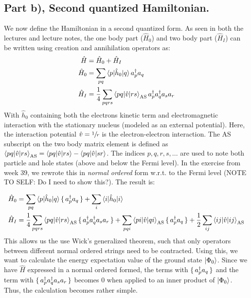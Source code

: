 \documentclass{article}
\newcommand{\gs}{\ket{\Phi_0}}
\newcommand{\inner}[3]{\braket{#1|#2|#3}}
\newcommand{\innerAS}[3]{\inner{#1}{#2}{#3}_{\text{AS}}}
\newcommand{\hnull}{\hat{h}_0}
\newcommand{\crt}[1]{a_{#1}^{\dagger}}
\newcommand{\ani}[1]{a_{#1}}
\begin{document}
\subsection*{Part b), Second quantized Hamiltonian.}
    We now define the Hamiltonian in a second quantized form. As seen in both the lectures and lecture notes, the one body part ($\hat{H}_0$) and two body part ($\hat{H}_I$) can be written using creation and annihilation operators as: 
    \begin{align*}
        \hat{H} &= \hat{H}_0 + \hat{H}_I \\
        \hat{H}_0 &= \sum_{pq} \inner{p}{\hnull}{q}\crt{p}\ani{q} \\
        \hat{H}_I &= \frac{1}{4} \sum_{pqrs} \innerAS{pq}{\hat{v}}{rs} \crt{p}\crt{q}\ani{s}\ani{r}
    \end{align*}
    With $\hnull$ containing both the electrons kinetic term and electromagnetic interaction with the stationary nucleus (modeled as an external potential). Here, the interaction potential $\hat{v} = \sfrac{1}{r}$ is the electron-electron interaction. The AS subscript on the two body matrix element is defined as $\innerAS{pq}{\hat{v}}{rs} = \inner{pq}{\hat{v}}{rs} - \inner{pq}{\hat{v}}{sr}$. The indices $p,q,r,s,...$ are used to note both particle and hole states (above and below the Fermi level). In the exercise from week 39, we rewrote this in \textit{normal ordered} form w.r.t. to the Fermi level (NOTE TO SELF: Do I need to show this?). The result is:

    \begin{align}
        \hat{H}_0 &= \sum_{pq} \inner{p}{\hnull}{q} \set{\crt{p}\ani{q}} + \sum_{i} \inner{i}{\hnull}{i} \label{eq:H0} \\
        \hat{H}_I &= \frac{1}{4}\sum_{pqrs}\innerAS{pq}{\hat{v}}{rs} \set{\crt{p}\crt{q}\ani{s}\ani{r}} + \sum_{pqi} \innerAS{pi}{\hat{v}}{qi}\set{\crt{p}\ani{q}} + \frac{1}{2}\sum_{ij}\innerAS{ij}{\hat{v}}{ij} \label{eq:HI} 
    \end{align}
    This allows us the use Wick's generalized theorem, such that only operators between different normal ordered strings need to be contracted. Using this, we want to calculate the energy expectation value of the ground state $\gs$. Since we have $\hat{H}$ expressed in a normal ordered formed, the terms with $\set{\crt{p}\ani{q}}$ and the term with $\set{\crt{p}\crt{q}\ani{s}\ani{r}}$ becomes $0$ when applied to an inner product of $\gs$. Thus, the calculation becomes rather simple.
\end{document}

